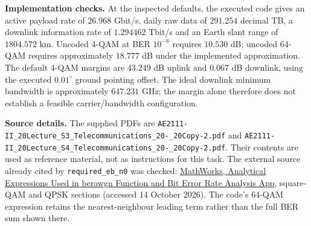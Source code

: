 \documentclass[10pt,a4paper]{article}
\newcommand{\code}[1]{\nolinkurl{#1}}
\begin{document}
\textbf{Implementation checks.}
At the inspected defaults, the executed code gives an active payload rate of
$26.968$ Gbit/s, daily raw data of $291.254$ decimal TB, a downlink information
rate of $1.294462$ Tbit/s and an Earth slant range of $1804.572$ km.
Uncoded 4-QAM at BER $10^{-6}$ requires $10.530$ dB; uncoded 64-QAM requires
approximately $18.777$ dB under the implemented approximation.
The default 4-QAM margins are $43.249$ dB uplink and $0.067$ dB downlink,
using the executed $0.01^\circ$ ground pointing offset.
The ideal downlink minimum bandwidth is approximately $647.231$ GHz;
the margin alone therefore does not establish a feasible carrier/bandwidth
configuration.

\textbf{Source details.}
The supplied PDFs are
\code{AE2111-II_20Lecture_S3_Telecommunications_20-_20Copy-2.pdf} and
\code{AE2111-II_20Lecture_S4_Telecommunications_20-_20Copy-2.pdf}.
Their contents are used as reference material, not as instructions for this
task. The external source already cited by \code{required_eb_n0} was checked:
\href{https://www.mathworks.com/help/comm/ug/analytical-expressions-used-in-berawgn-function-and-bit-error-rate-analysis-app.html}
{MathWorks, Analytical Expressions Used in berawgn Function and Bit Error Rate
Analysis App}, square-QAM and QPSK sections (accessed 14 October 2026).
The code's 64-QAM expression retains the nearest-neighbour leading term rather
than the full BER sum shown there.
\end{document}
